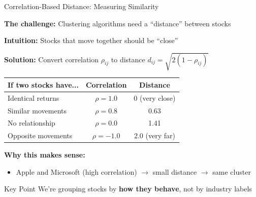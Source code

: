 \documentclass[10pt]{beamer}
\newcommand{\highlight}[1]{\textcolor{AccentOrange}{\textbf{#1}}}
\begin{document}
\begin{frame}{Correlation-Based Distance: Measuring Similarity}

  \textbf{The challenge:} Clustering algorithms need a ``distance'' between stocks

  \vspace{0.5em}
  \textbf{Intuition:} Stocks that move together should be ``close''

  \vspace{1em}
  \textbf{Solution:} Convert correlation $\rho_{ij}$ to distance $d_{ij} = \sqrt{2(1 - \rho_{ij})}$
  \vspace{0.5em}
  \begin{center}
  \begin{tabular}{lcc}
    \toprule
    \textbf{If two stocks have...} & \textbf{Correlation} & \textbf{Distance} \\
    \midrule
    Identical returns & $\rho = 1.0$ & 0 (very close) \\
    Similar movements & $\rho = 0.8$ & 0.63 \\
    No relationship & $\rho = 0.0$ & 1.41 \\
    Opposite movements & $\rho = -1.0$ & 2.0 (very far) \\
    \bottomrule
  \end{tabular}
  \end{center}

  \vspace{1em}
  \textbf{Why this makes sense:}
  \begin{itemize}
    \item Apple and Microsoft (high correlation) $\rightarrow$ small distance $\rightarrow$ same cluster
  \end{itemize}

 \vspace{0.5em}
  \begin{block}{Key Point}
    We're grouping stocks by \highlight{how they behave}, not by industry labels
  \end{block}
\end{frame}

\end{document}
